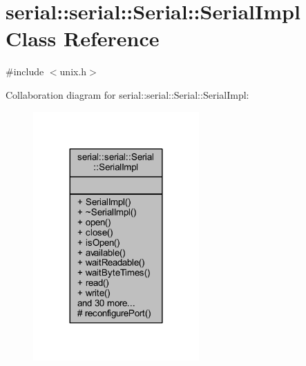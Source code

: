 \hypertarget{classserial_1_1serial_1_1_serial_1_1_serial_impl}{}\section{serial\+:\+:serial\+:\+:Serial\+:\+:Serial\+Impl Class Reference}
\label{classserial_1_1serial_1_1_serial_1_1_serial_impl}


{\ttfamily \#include $<$unix.\+h$>$}



Collaboration diagram for serial\+:\+:serial\+:\+:Serial\+:\+:Serial\+Impl\+:\nopagebreak
\begin{figure}[H]
\begin{center}
\leavevmode
\includegraphics[width=180pt]{classserial_1_1serial_1_1_serial_1_1_serial_impl__coll__graph}
\end{center}
\end{figure}
